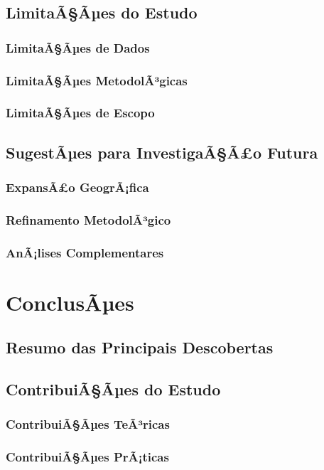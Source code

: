 \documentclass[12pt, a4paper]{article}
\begin{document}
\subsection{LimitaÃ§Ãµes do Estudo}
\subsubsection{LimitaÃ§Ãµes de Dados}
\subsubsection{LimitaÃ§Ãµes MetodolÃ³gicas}
\subsubsection{LimitaÃ§Ãµes de Escopo}

\subsection{SugestÃµes para InvestigaÃ§Ã£o Futura}
\subsubsection{ExpansÃ£o GeogrÃ¡fica}
\subsubsection{Refinamento MetodolÃ³gico}
\subsubsection{AnÃ¡lises Complementares}

\section{ConclusÃµes}
\subsection{Resumo das Principais Descobertas}
\subsection{ContribuiÃ§Ãµes do Estudo}
\subsubsection{ContribuiÃ§Ãµes TeÃ³ricas}
\subsubsection{ContribuiÃ§Ãµes PrÃ¡ticas}
\end{document}
